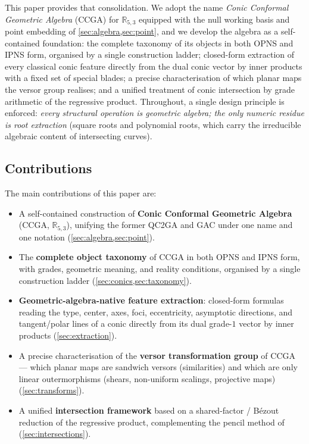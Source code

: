 \documentclass{birkjour}
\theoremstyle{definition}
\theoremstyle{remark}
\begin{document}
This paper provides that consolidation. We adopt the name \emph{Conic
Conformal Geometric Algebra} (CCGA) for $\mathbb{R}_{5,3}$ equipped with the
null working basis and point embedding of \cref{sec:algebra,sec:point}, and we
develop the algebra as a self-contained foundation: the complete taxonomy of
its objects in both OPNS and IPNS form, organised by a single construction
ladder; closed-form extraction of every classical conic feature directly from
the dual conic vector by inner products with a fixed set of special blades;
a precise characterisation of which planar maps the versor group realises; and
a unified treatment of conic intersection by grade arithmetic of the
regressive product. Throughout, a single design principle is enforced:
\emph{every structural operation is geometric algebra; the only numeric
residue is root extraction} (square roots and polynomial roots, which carry
the irreducible algebraic content of intersecting curves).

\subsection{Contributions}
\label{sec:contributions}
The main contributions of this paper are:
\begin{itemize}
  \item A self-contained construction of \textbf{Conic Conformal Geometric
    Algebra} (CCGA, $\mathbb{R}_{5,3}$), unifying the former QC2GA and GAC
    under one name and one notation (\cref{sec:algebra,sec:point}).
  \item The \textbf{complete object taxonomy} of CCGA in both OPNS and IPNS
    form, with grades, geometric meaning, and reality conditions, organised by
    a single construction ladder (\cref{sec:conics,sec:taxonomy}).
  \item \textbf{Geometric-algebra-native feature extraction}: closed-form
    formulas reading the type, center, axes, foci, eccentricity, asymptotic
    directions, and tangent/polar lines of a conic directly from its dual
    grade-$1$ vector by inner products (\cref{sec:extraction}).
  \item A precise characterisation of the \textbf{versor transformation group}
    of CCGA — which planar maps are sandwich versors (similarities) and which
    are only linear outermorphisms (shears, non-uniform scalings, projective
    maps) (\cref{sec:transforms}).
  \item A unified \textbf{intersection framework} based on a shared-factor /
    B\'ezout reduction of the regressive product, complementing the pencil
    method of~\cite{chomicki_intersection_2023} (\cref{sec:intersections}).
\end{itemize}
\end{document}
